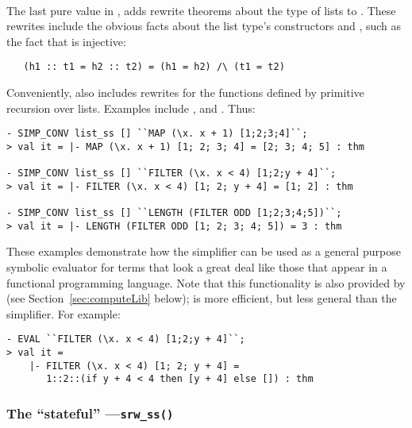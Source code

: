 \paragraph{}
%
%
The last pure \simpset{} value in ,  adds
rewrite theorems about the type of lists to .  These
rewrites include the obvious facts about the list type's constructors
 and , such as the fact that  is
injective:
\begin{verbatim}
   (h1 :: t1 = h2 :: t2) = (h1 = h2) /\ (t1 = t2)
\end{verbatim}
Conveniently,  also includes rewrites for the functions
defined by primitive recursion over lists.  Examples include
,  and .  Thus:
\begin{session}
\begin{verbatim}
- SIMP_CONV list_ss [] ``MAP (\x. x + 1) [1;2;3;4]``;
> val it = |- MAP (\x. x + 1) [1; 2; 3; 4] = [2; 3; 4; 5] : thm

- SIMP_CONV list_ss [] ``FILTER (\x. x < 4) [1;2;y + 4]``;
> val it = |- FILTER (\x. x < 4) [1; 2; y + 4] = [1; 2] : thm

- SIMP_CONV list_ss [] ``LENGTH (FILTER ODD [1;2;3;4;5])``;
> val it = |- LENGTH (FILTER ODD [1; 2; 3; 4; 5]) = 3 : thm
\end{verbatim}
\end{session}
These examples demonstrate how the simplifier can be used as a general
purpose symbolic evaluator for terms that look a great deal like those
that appear in a functional programming language.  Note that
this functionality is also provided by  (see
Section~\ref{sec:computeLib} below);  is more
efficient, but less general than the simplifier.  For example:
\begin{session}
\begin{verbatim}
- EVAL ``FILTER (\x. x < 4) [1;2;y + 4]``;
> val it =
    |- FILTER (\x. x < 4) [1; 2; y + 4] =
       1::2::(if y + 4 < 4 then [y + 4] else []) : thm
\end{verbatim}
\end{session}

\subsubsection{The ``stateful'' \simpset---\texttt{srw\_ss()}}

